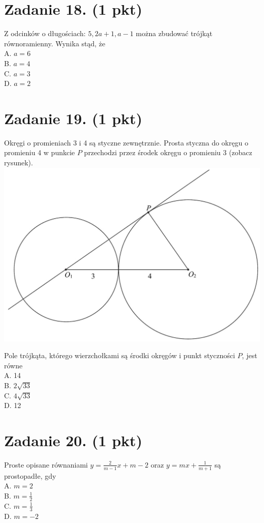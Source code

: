 \documentclass[10pt]{article}
\begin{document}
\section*{Zadanie 18. (1 pkt)}
Z odcinków o długościach: \(5,2 a+1, a-1\) można zbudować trójkąt równoramienny. Wynika stąd, że\\
A. \(a=6\)\\
B. \(a=4\)\\
C. \(a=3\)\\
D. \(a=2\)

\section*{Zadanie 19. (1 pkt)}
Okręgi o promieniach 3 i 4 są styczne zewnętrznie. Prosta styczna do okręgu o promieniu 4 w punkcie \(P\) przechodzi przez środek okręgu o promieniu 3 (zobacz rysunek).\\
\includegraphics[max width=\textwidth, center]{2024_11_21_779b7f825da3a12753feg-08}

Pole trójkąta, którego wierzchołkami są środki okręgów i punkt styczności \(P\), jest równe\\
A. 14\\
B. \(2 \sqrt{33}\)\\
C. \(4 \sqrt{33}\)\\
D. 12

\section*{Zadanie 20. (1 pkt)}
Proste opisane równaniami \(y=\frac{2}{m-1} x+m-2\) oraz \(y=m x+\frac{1}{m+1}\) są prostopadłe, gdy\\
A. \(m=2\)\\
B. \(m=\frac{1}{2}\)\\
C. \(m=\frac{1}{3}\)\\
D. \(m=-2\)
\end{document}
